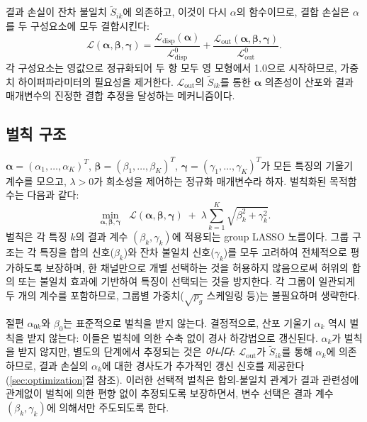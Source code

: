 \documentclass[a4paper,11pt]{article}
\begin{document}
결과 손실이 잔차 불일치 $\tilde S_{ik}$에 의존하고, 이것이 다시 $\alpha$의 함수이므로, 결합 손실은 $\alpha$를 두 구성요소에 모두 결합시킨다:
\begin{equation}\label{eq:joint_loss}
  \mathcal{L}(\boldsymbol{\alpha}, \boldsymbol{\beta}, \boldsymbol{\gamma}) = \frac{\mathcal{L}_{\mathrm{disp}}(\boldsymbol{\alpha})}{\mathcal{L}_{\mathrm{disp}}^0}
              + \frac{\mathcal{L}_{\mathrm{out}}(\boldsymbol{\alpha}, \boldsymbol{\beta}, \boldsymbol{\gamma})}{\mathcal{L}_{\mathrm{out}}^0}.
\end{equation}
각 구성요소는 영값으로 정규화되어 두 항 모두 영 모형에서 1.0으로 시작하므로, 가중치 하이퍼파라미터의 필요성을 제거한다.
$\mathcal{L}_{\mathrm{out}}$의 $\tilde S_{ik}$를 통한 $\boldsymbol{\alpha}$ 의존성이 산포와 결과 매개변수의 진정한 결합 추정을 달성하는 메커니즘이다.

\subsection{벌칙 구조}\label{sec:penalty}

$\boldsymbol{\alpha} = (\alpha_1,\dots,\alpha_K)^T$, $\boldsymbol{\beta} = (\beta_1,\dots,\beta_K)^T$, $\boldsymbol{\gamma} = (\gamma_1,\dots,\gamma_K)^T$가 모든 특징의 기울기 계수를 모으고, $\lambda > 0$가 희소성을 제어하는 정규화 매개변수라 하자.
벌칙화된 목적함수는 다음과 같다:
\begin{equation}\label{eq:objective}
  \min_{\boldsymbol{\alpha}, \boldsymbol{\beta}, \boldsymbol{\gamma}} \;\;
  \mathcal{L}(\boldsymbol{\alpha}, \boldsymbol{\beta}, \boldsymbol{\gamma})
  \;+\; \lambda \sum_{k=1}^K \sqrt{\beta_k^2 + \gamma_k^2}.
\end{equation}
벌칙은 각 특징 $k$의 결과 계수 $(\beta_k, \gamma_k)$에 적용되는 group LASSO 노름이다.
그룹 구조는 각 특징을 합의 신호($\beta_k$)와 잔차 불일치 신호($\gamma_k$)를 모두 고려하여 전체적으로 평가하도록 보장하며, 한 채널만으로 개별 선택하는 것을 허용하지 않음으로써 허위의 합의 또는 불일치 효과에 기반하여 특징이 선택되는 것을 방지한다.
각 그룹이 일관되게 두 개의 계수를 포함하므로, 그룹별 가중치($\sqrt{p_g}$ 스케일링 등)는 불필요하며 생략한다.

절편 $\alpha_{0k}$와 $\beta_0$는 표준적으로 벌칙을 받지 않는다.
결정적으로, 산포 기울기 $\alpha_k$ 역시 벌칙을 받지 않는다: 이들은 벌칙에 의한 수축 없이 경사 하강법으로 갱신된다.
$\alpha_k$가 벌칙을 받지 않지만, 별도의 단계에서 추정되는 것은 \emph{아니다}: $\mathcal{L}_{\mathrm{out}}$가 $\tilde S_{ik}$를 통해 $\alpha_k$에 의존하므로, 결과 손실의 $\alpha_k$에 대한 경사도가 추가적인 갱신 신호를 제공한다(\ref{sec:optimization}절 참조).
이러한 선택적 벌칙은 합의-불일치 관계가 결과 관련성에 관계없이 벌칙에 의한 편향 없이 추정되도록 보장하면서, 변수 선택은 결과 계수 $(\beta_k, \gamma_k)$에 의해서만 주도되도록 한다.
\end{document}
